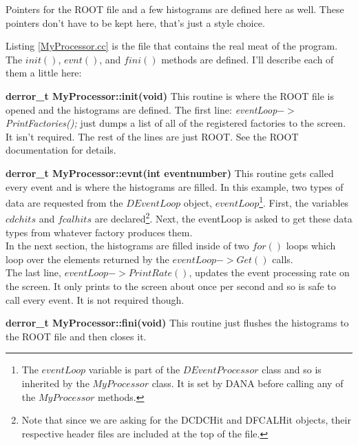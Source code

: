 \documentclass[12pt]{article}
\begin{document}
Pointers for the ROOT file and a few histograms are defined
here as well. These pointers don't have to be kept here, that's
just a style choice.



\newpage
Listing \ref{MyProcessor.cc} is the file that contains the real meat
of the program. The $init()$, $evnt()$, and $fini()$ methods
are defined. I'll describe each of them a little here:

\begin{description}
\item{\bf derror\_t MyProcessor::init(void)}
This routine is where the ROOT file is opened and the histograms are
defined. The first line: {\it eventLoop$->$PrintFactories();} just
dumps a list of all of the registered factories to the screen. It isn't
required. The rest of the lines are just ROOT. See the ROOT documentation
for details.

\item{\bf derror\_t MyProcessor::evnt(int eventnumber)}
This routine gets called every event and is where the histograms
are filled. In this example, two types of data are requested from
the $DEventLoop$ object, $eventLoop$\footnote{The $eventLoop$ variable
is part of the $DEventProcessor$ class and so is inherited by
the $MyProcessor$ class. It is set by DANA before calling any of
the $MyProcessor$ methods.}. First, the variables $cdchits$ and
$fcalhits$ are declared\footnote{Note that since we are asking for
the DCDCHit and DFCALHit objects, their respective header files are
included at the top of the file.}. Next, the eventLoop is asked to
get these data types from whatever factory produces them.\\

In the next section, the histograms are filled inside of
two $for()$ loops which loop over the elements returned by
the $eventLoop->Get()$ calls.\\

The last line, $eventLoop->PrintRate()$, updates the event processing
rate on the screen. It only prints to the screen about once per second
and so is safe to call every event. It is not required though.

\item{\bf derror\_t MyProcessor::fini(void)}
This routine just flushes the histograms to the ROOT file and then closes it.
\end{description}
\end{document}
